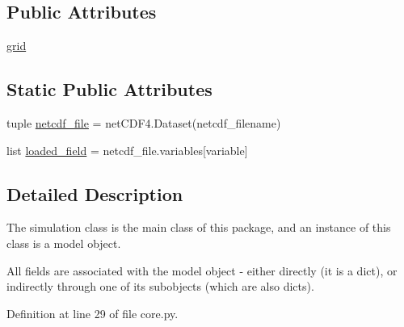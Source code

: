 \subsection*{Public Attributes}
\begin{DoxyCompactItemize}
\item 
\hyperlink{classmitgcm_1_1core_1_1MITgcm__Simulation_a984db65a189bf843e988079f724cdee3}{grid}
\end{DoxyCompactItemize}
\subsection*{Static Public Attributes}
\begin{DoxyCompactItemize}
\item 
tuple \hyperlink{classmitgcm_1_1core_1_1MITgcm__Simulation_a801f2b7847cdd50c031f6f566e263189}{netcdf\+\_\+file} = net\+C\+D\+F4.\+Dataset(netcdf\+\_\+filename)
\item 
list \hyperlink{classmitgcm_1_1core_1_1MITgcm__Simulation_ad50484938272dfc5107b0af495443d25}{loaded\+\_\+field} = netcdf\+\_\+file.\+variables\mbox{[}variable\mbox{]}
\end{DoxyCompactItemize}


\subsection{Detailed Description}
The simulation class is the main class of this package, and an instance of this class is a model object. 

All fields are associated with the model object -\/ either directly (it is a dict), or indirectly through one of its subobjects (which are also dicts). 

Definition at line 29 of file core.\+py.



